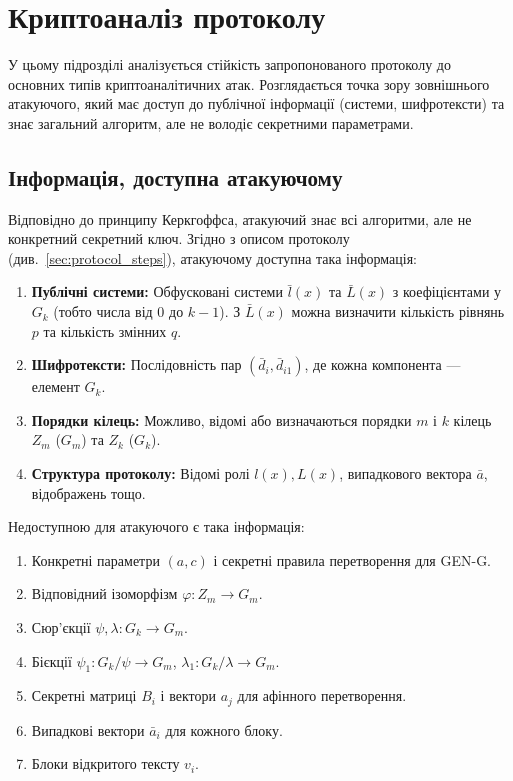 \section{Криптоаналіз протоколу}
\label{sec:protocol_cryptanalysis}
У цьому підрозділі аналізується стійкість запропонованого протоколу до основних типів криптоаналітичних атак.
Розглядається точка зору зовнішнього атакуючого, який має доступ до публічної інформації (системи, шифротексти) та знає загальний алгоритм, але не володіє секретними параметрами.

\subsection{Інформація, доступна атакуючому}
\label{subsec:attacker_knowledge}
Відповідно до принципу Керкгоффса, атакуючий знає всі алгоритми, але не конкретний секретний ключ.
Згідно з описом протоколу (див.~\ref{sec:protocol_steps}), атакуючому доступна така інформація:
\begin{enumerate}
    \item \textbf{Публічні системи:} Обфусковані системи $\bar{l}(x)$ та $\bar{L}(x)$ з коефіцієнтами у $G_k$ (тобто числа від $0$ до $k-1$). З $\bar{L}(x)$ можна визначити кількість рівнянь $p$ та кількість змінних $q$.
    \item \textbf{Шифротексти:} Послідовність пар $(\bar{d}_i, \bar{d}_{i1})$, де кожна компонента — елемент $G_k$.
    \item \textbf{Порядки кілець:} Можливо, відомі або визначаються порядки $m$ і $k$ кілець $Z_m$ ($G_m$) та $Z_k$ ($G_k$).
    \item \textbf{Структура протоколу:} Відомі ролі $l(x), L(x)$, випадкового вектора $\bar{a}$, відображень тощо.
\end{enumerate}
Недоступною для атакуючого є така інформація:
\begin{enumerate}
    \item Конкретні параметри $(a, c)$ і секретні правила перетворення для GEN-G.
    \item Відповідний ізоморфізм $\varphi: Z_m \to G_m$.
    \item Сюр'єкції $\psi, \lambda: G_k \to G_m$.
    \item Бієкції $\psi_1: G_k/\psi \to G_m$, $\lambda_1: G_k/\lambda \to G_m$.
    \item Секретні матриці $B_i$ і вектори $a_j$ для афінного перетворення.
    \item Випадкові вектори $\bar{a}_i$ для кожного блоку.
    \item Блоки відкритого тексту $v_i$.
\end{enumerate}

